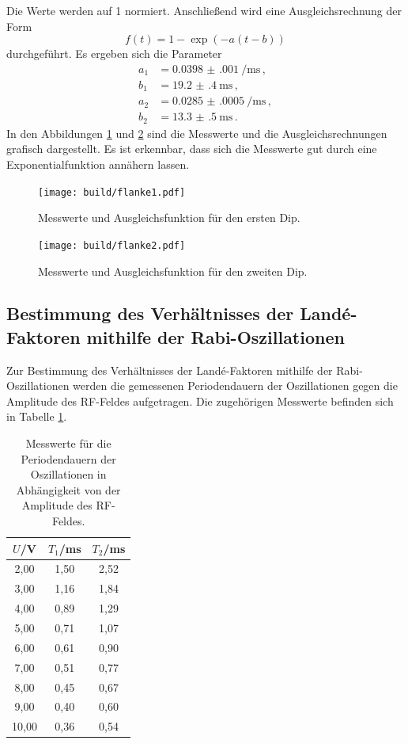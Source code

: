 Die Werte werden auf 1 normiert. Anschließend wird eine Ausgleichsrechnung der Form
\begin{equation*}
  f(t)=1-\exp(-a(t-b))
\end{equation*}
durchgeführt. Es ergeben sich die Parameter
\begin{align*}
  a_1&=\SI{0.0398(0010)}{\per\milli\second} \,,\\
  b_1&=\SI{19.2(4)}{\milli\second} \,,\\
  a_2&=\SI{0.0285(0005)}{\per\milli\second}\,,\\
  b_2&=\SI{13.3(5)}{\milli\second} \,.
\end{align*}
In den Abbildungen \ref{fig:flankefit1} und \ref{fig:flankefit2} sind die Messwerte und die
Ausgleichsrechnungen grafisch dargestellt. Es ist erkennbar, dass sich die Messwerte gut
durch eine Exponentialfunktion annähern lassen.

\begin{figure}
  \centering
  \texttt{[image: build/flanke1.pdf]}
  \caption{Messwerte und Ausgleichsfunktion für den ersten Dip.}
  \label{fig:flankefit1}
\end{figure}
\begin{figure}
  \centering
  \texttt{[image: build/flanke2.pdf]}
  \caption{Messwerte und Ausgleichsfunktion für den zweiten Dip.}
  \label{fig:flankefit2}
\end{figure}

\subsection{Bestimmung des Verhältnisses der Landé-Faktoren mithilfe der Rabi-Oszillationen}
\label{subsec:oszillationen}
Zur Bestimmung des Verhältnisses der Landé-Faktoren mithilfe der Rabi-Oszillationen werden
die gemessenen Periodendauern der Oszillationen gegen die Amplitude des RF-Feldes aufgetragen.
Die zugehörigen Messwerte befinden sich in Tabelle \ref{tab:oszi}.

\begin{table}[htp]
	\begin{center}
    \caption{Messwerte für die Periodendauern der Oszillationen in Abhängigkeit von der Amplitude des RF-Feldes.}
    \label{tab:oszi}
		\begin{tabular}{ccc}
		\toprule
			{$U$/V} & {$T_1$/ms} & {$T_2$/ms}\\
			\midrule
			2,00 & 1,50 & 2,52\\
			3,00 & 1,16 & 1,84\\
			4,00 & 0,89 & 1,29\\
			5,00 & 0,71 & 1,07\\
			6,00 & 0,61 & 0,90\\
			7,00 & 0,51 & 0,77\\
			8,00 & 0,45 & 0,67\\
			9,00 & 0,40 & 0,60\\
			10,00 & 0,36 & 0,54\\
		\bottomrule
		\end{tabular}
	\end{center}
\end{table}

